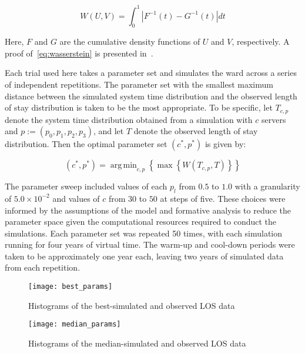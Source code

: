 \documentclass[]{interact}
\newlength{\imgwidth}
\theoremstyle{plain}%
\theoremstyle{definition}
\theoremstyle{remark}
\DeclareMathOperator*{\argmin}{arg\,min}
\begin{document}
\begin{equation}\label{eq:wasserstein}
    W(U, V) = \int_{0}^{1} \left\vert F^{-1}(t) - G^{-1}(t) \right\vert dt
\end{equation}

Here, \(F\) and \(G\) are the cumulative density functions of \(U\) and \(V\),
respectively. A proof of~\eqref{eq:wasserstein} is presented
in~\cite{Ramdas2017}.

Each trial used here takes a parameter set and simulates the ward across a
series of independent repetitions. The parameter set with the smallest maximum
distance between the simulated system time distribution and the observed length
of stay distribution is taken to be the most appropriate. To be specific, let
\(T_{c,p}\) denote the system time distribution obtained from a simulation with
\(c\) servers and \(p := \left(p_0,p_1,p_2,p_3\right)\), and let \(T\) denote
the observed length of stay distribution. Then the optimal parameter set
\(\left(c^*, p^*\right)\) is given by:

\begin{equation}\label{eq:parameters}
    \left(c^*, p^*\right) = \argmin_{c, p} \left\{%
        \max \left\{ W\left(T_{c,p}, T\right) \right\}%
    \right\}
\end{equation}

The parameter sweep included values of each \(p_l\) from \(0.5\) to \(1.0\) with
a granularity of \(5.0 \times 10^{-2}\) and values of \(c\) from \(30\) to
\(50\) at steps of five. These choices were informed by the assumptions of the
model and formative analysis to reduce the parameter space given the
computational resources required to conduct the simulations. Each parameter set
was repeated 50 times, with each simulation running for four years of virtual
time. The warm-up and cool-down periods were taken to be approximately one year
each, leaving two years of simulated data from each repetition.

\begin{figure}
    \centering
    \texttt{[image: best\_params]}
    \caption{%
        Histograms of the best-simulated and observed LOS data
    }\label{fig:best_params}
\end{figure}

\begin{figure}
    \centering
    \texttt{[image: median\_params]}
    \caption{%
        Histograms of the median-simulated and observed LOS data
    }\label{fig:median_params}
\end{figure}
\end{document}
